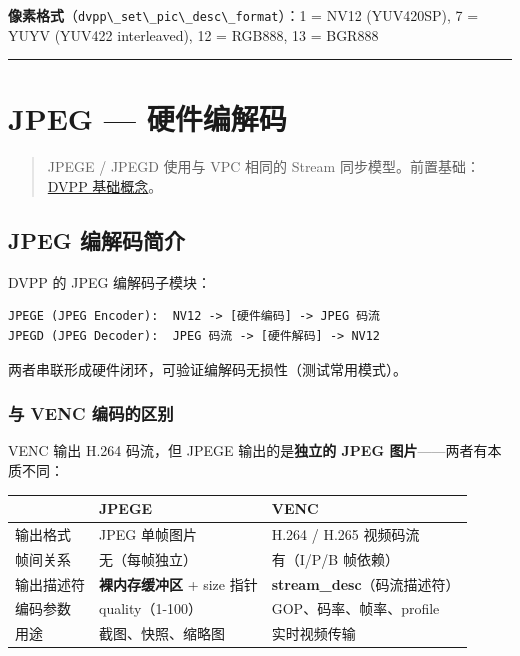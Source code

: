\textbf{像素格式}（\passthrough{\lstinline!dvpp\_set\_pic\_desc\_format!}）：1
= NV12 (YUV420SP), 7 = YUYV (YUV422 interleaved), 12 = RGB888, 13 =
BGR888

\begin{center}\rule{0.5\linewidth}{0.5pt}\end{center}

\section{JPEG --- 硬件编解码}\label{jpeg}

\begin{quote}
JPEGE / JPEGD 使用与 VPC 相同的 Stream
同步模型。前置基础：\hyperref[dvpp-basics]{DVPP 基础概念}。
\end{quote}

\subsection{JPEG 编解码简介}\label{src-book-chapter6-h115}

DVPP 的 JPEG 编解码子模块：

\begin{lstlisting}
JPEGE (JPEG Encoder):  NV12 -> [硬件编码] -> JPEG 码流
JPEGD (JPEG Decoder):  JPEG 码流 -> [硬件解码] -> NV12
\end{lstlisting}

两者串联形成硬件闭环，可验证编解码无损性（测试常用模式）。

\subsubsection{与 VENC 编码的区别}\label{src-book-chapter6-h116}

VENC 输出 H.264 码流，但 JPEGE 输出的是\textbf{独立的 JPEG
图片}------两者有本质不同：

\begin{longtable}[]{@{}
  >{\raggedright\arraybackslash}p{}
  >{\raggedright\arraybackslash}p{}
  >{\raggedright\arraybackslash}p{}@{}}
\toprule\noalign{}
\begin{minipage}[b]{\linewidth}\raggedright
\end{minipage} & \begin{minipage}[b]{\linewidth}\raggedright
JPEGE
\end{minipage} & \begin{minipage}[b]{\linewidth}\raggedright
VENC
\end{minipage} \\
\midrule\noalign{}
\endhead
\bottomrule\noalign{}
\endlastfoot
输出格式 & JPEG 单帧图片 & H.264 / H.265 视频码流 \\
帧间关系 & 无（每帧独立） & 有（I/P/B 帧依赖） \\
输出描述符 & \textbf{裸内存缓冲区} + size 指针 &
\textbf{stream\_desc}（码流描述符） \\
编码参数 & quality（1-100） & GOP、码率、帧率、profile \\
用途 & 截图、快照、缩略图 & 实时视频传输 \\
\end{longtable}

